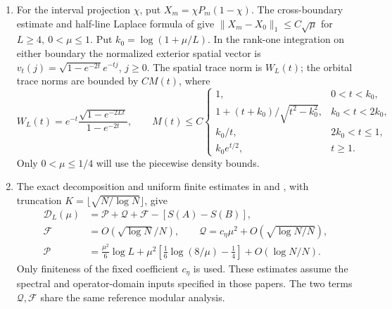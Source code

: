 \documentclass[11pt,letterpaper]{article}
\newcommand{\cD}{\mathcal D}
\begin{document}
\begin{enumerate}[label=(\roman*)]
\item For the interval projection \(\chi\), put \(X_m=\chi P_m(1-\chi)\). The cross-boundary estimate and half-line Laplace formula of \cite[part 9, Eqs.~(3)--(6), Theorem 1]{d8} give \(\|X_m-X_0\|_1\le C\sqrt\mu\) for \(L\ge4,\ 0<\mu\le1\). Put \(k_0=\log(1+\mu/L)\). In the rank-one integration on either boundary the normalized exterior spatial vector is \(v_t(j)=\sqrt{1-e^{-2t}}e^{-tj}\), \(j\ge0\). The spatial trace norm is \(W_L(t)\); the orbital trace norms are bounded by \(CM(t)\), where
\[
 W_L(t)=e^{-t}\frac{\sqrt{1-e^{-2Lt}}}{1-e^{-2t}},\qquad
 M(t)\le C\begin{cases}
 1,&0<t<k_0,\\
 1+(t+k_0)/\sqrt{t^2-k_0^2},&k_0<t<2k_0,\\
 k_0/t,&2k_0<t\le1,\\
 k_0 e^{t/2},&t\ge1 .
 \end{cases}
\]
Only \(0<\mu\le1/4\) will use the piecewise density bounds.
\item The exact decomposition and uniform finite estimates in \cite[Corollary 4 and Eq.~(8)]{d4} and \cite[pp.~2--3]{d5}, with truncation \(K=\lfloor\sqrt{N/\log N}\rfloor\), give
\begin{align*}
 \cD_L(\mu)&=\mathcal P+\mathcal Q+\mathcal F-[S(A)-S(B)],\\
 \mathcal F&=O(\sqrt{\log N}/N),\qquad
 \mathcal Q=c_\eta\mu^2+O(\sqrt{\log N/N}),\\
 \mathcal P&=\frac{\mu^2}6\log L
    +\mu^2\!\left[\frac16\log(8/\mu)-\frac14\right]+O(\log N/N).
\end{align*}
Only finiteness of the fixed coefficient \(c_\eta\) is used. These estimates assume the spectral and operator-domain inputs specified in those papers. The two terms \(\mathcal Q,\mathcal F\) share the same reference modular analysis.
\end{enumerate}
\end{document}
